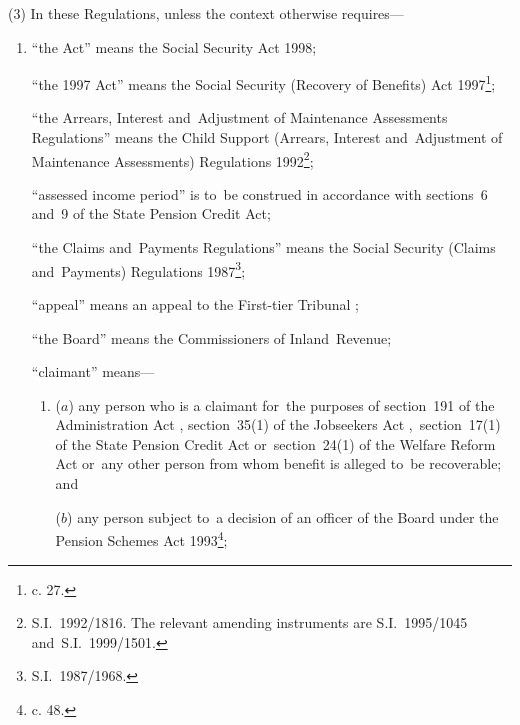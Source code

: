 \documentclass[12pt,a4paper]{article}
\begin{document}
(3) In these Regulations, unless the context otherwise requires—
\begin{enumerate}\item[]
“the Act” means the Social Security Act 1998;

“the 1997 Act” means the Social Security (Recovery of Benefits) Act 1997\footnote{ c. 27.};

“the Arrears, Interest and~Adjustment of Maintenance Assessments Regulations” means the Child Support (Arrears, Interest and~Adjustment of Maintenance Assessments) Regulations 1992\footnote{\frenchspacing S.I.~1992/1816. The relevant amending instruments are S.I.~1995/1045 and~S.I.~1999/1501.};

“assessed income period” is to~be construed in accordance with sections~6 and~9 of the State Pension Credit Act;

“the Claims and~Payments Regulations” means the Social Security (Claims and~Payments) Regulations 1987\footnote{\frenchspacing S.I.~1987/1968.};

“appeal” means an appeal to 
the First-tier Tribunal%
;

“the Board” means the Commissioners of Inland~Revenue;

“claimant” means—
\begin{enumerate}\item[]
($a$) any person who is a claimant for~the purposes of section~191 of the Administration Act%
, section~35(1) of the Jobseekers Act%
,~section~17(1) of the State Pension Credit Act or~section~24(1) of the Welfare Reform Act  %
or~any other person from whom benefit is alleged to~be recoverable; and

($b$) any person subject to~a decision of 
an officer of the Board  %
under the Pension Schemes Act 1993\footnote{ c. 48.};
\end{enumerate}


\end{enumerate}
\end{document}
